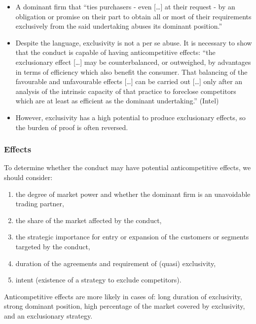             \begin{itemize}
                \item A dominant firm that “ties purchasers - even […] at their request - by an obligation or promise on their part to obtain all or most of their requirements exclusively from the said undertaking abuses its dominant position.”
                \item Despite the language, exclusivity is not a per se abuse. It is necessary to show that the conduct is capable of having anticompetitive effects: “the exclusionary effect […] may be counterbalanced, or outweighed, by advantages in terms of efficiency which also benefit the consumer. That balancing of the favourable and unfavourable effects […] can be carried out […] only after an analysis of the intrinsic capacity of that practice to foreclose competitors which are at least as efficient as the dominant undertaking.” (Intel)
                \item However, exclusivity has a high potential to produce exclusionary effects, so the burden of proof is often reversed.
            \end{itemize}

        \subsubsection{Effects}

            To determine whether the conduct may have potential anticompetitive effects, we should consider:
            
            \begin{enumerate}[label=\roman*.]
                \item the degree of market power and whether the dominant firm is an unavoidable trading partner,
                \item the share of the market affected by the conduct,
                \item the strategic importance for entry or expansion of the customers or segments targeted by the conduct,
                \item duration of the agreements and requirement of (quasi) exclusivity,
                \item intent (existence of a strategy to exclude competitors).
            \end{enumerate}
            
            Anticompetitive effects are more likely in cases of: long duration of exclusivity, strong dominant position, high percentage of the market covered by exclusivity, and an exclusionary strategy.
            
